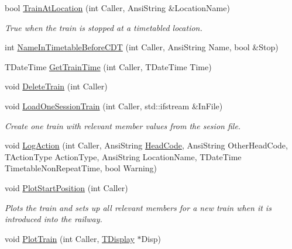 \begin{DoxyCompactItemize}
bool \mbox{\hyperlink{class_t_train_a935bb43db57a3f2b635be9dfc6a7988b}{Train\+At\+Location}} (int Caller, Ansi\+String \&Location\+Name)
\begin{DoxyCompactList}\small\item\em True when the train is stopped at a timetabled location. \end{DoxyCompactList}\item 
int \mbox{\hyperlink{class_t_train_a7a54125a3a5052cb25e17014075a686b}{Name\+In\+Timetable\+Before\+C\+DT}} (int Caller, Ansi\+String Name, bool \&Stop)
\item 
T\+Date\+Time \mbox{\hyperlink{class_t_train_ad249f34f6862e604b8e141d1b25fe57d}{Get\+Train\+Time}} (int Caller, T\+Date\+Time Time)
\item 
void \mbox{\hyperlink{class_t_train_afd5d7ea375b8a878c31d81841acad159}{Delete\+Train}} (int Caller)
\item 
\mbox{\label{class_t_train_a23c65e7f2b2130ae87811f70afb6d5bf}} 
void \mbox{\hyperlink{class_t_train_a23c65e7f2b2130ae87811f70afb6d5bf}{Load\+One\+Session\+Train}} (int Caller, std\+::ifstream \&In\+File)
\begin{DoxyCompactList}\small\item\em Create one train with relevant member values from the sesion file. \end{DoxyCompactList}\item 
void \mbox{\hyperlink{class_t_train_a493ab1c185d29bf28ec8fded2356e9fc}{Log\+Action}} (int Caller, Ansi\+String \mbox{\hyperlink{class_t_train_a68f4b62f3405f80d58f33519392ab37e}{Head\+Code}}, Ansi\+String Other\+Head\+Code, T\+Action\+Type Action\+Type, Ansi\+String Location\+Name, T\+Date\+Time Timetable\+Non\+Repeat\+Time, bool Warning)
\item 
\mbox{\label{class_t_train_a43cd691f12297c4c13a19791329dd627}} 
void \mbox{\hyperlink{class_t_train_a43cd691f12297c4c13a19791329dd627}{Plot\+Start\+Position}} (int Caller)
\begin{DoxyCompactList}\small\item\em Plots the train and sets up all relevant members for a new train when it is introduced into the railway. \end{DoxyCompactList}\item 
\mbox{\label{class_t_train_a5fdef825574f0e546ab25169e9f8445d}} 
void \mbox{\hyperlink{class_t_train_a5fdef825574f0e546ab25169e9f8445d}{Plot\+Train}} (int Caller, \mbox{\hyperlink{class_t_display}{T\+Display}} $\ast$Disp)

\end{DoxyCompactItemize}
